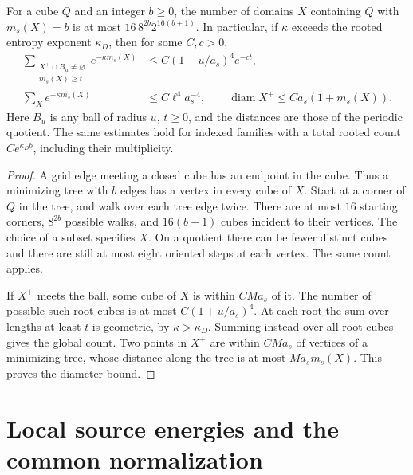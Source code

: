 \documentclass[11pt,letterpaper,reqno]{amsart}
\makeatletter
\numberwithin{equation}{section}
\theoremstyle{definition}
\newcommand{\ms@minorstart}{%
  \pushQED{\qed}\renewcommand{\qedsymbol}{$\blacksquare$}}
\newenvironment{lemma}[1][]{\ms@minorstart\ms@lemma[#1]}
  {\popQED\endms@lemma}
\theoremstyle{remark}
\makeatother
\begin{document}
\begin{samepage}
\begin{lemma}[Rooted domain counts]\label{si:lem-source-count}
For a cube $Q$ and an integer $b\ge0$, the number of domains
$X$ containing $Q$ with $m_s(X)=b$ is at most
$16\,8^{2b}2^{16(b+1)}$. In particular, if $\kappa$ exceeds the
rooted entropy exponent $\kappa_D$, then for some $C,c>0$,
\begin{equation}\label{si:eq-source-count}
 \begin{aligned}
 \sum_{\substack{X^+\cap B_u\ne\varnothing\\m_s(X)\ge t}}
     e^{-\kappa m_s(X)}
   &\le C(1+u/a_s)^4 e^{-ct},\\
 \sum_X e^{-\kappa m_s(X)}
   &\le C\ell^4 a_s^{-4},
 \qquad
 \operatorname{diam}X^+\le C a_s(1+m_s(X)).
 \end{aligned}
\end{equation}
Here $B_u$ is any ball of radius $u$, $t\ge0$, and the distances
are those of the periodic quotient. The same estimates hold for
indexed families with a total rooted count
$C e^{\kappa_D b}$, including their multiplicity.
\end{lemma}
\end{samepage}

\begin{proof}
A grid edge meeting a closed cube has an endpoint in the cube.
Thus a minimizing tree with $b$ edges has a vertex in every
cube of $X$. Start at a corner of $Q$ in the tree, and walk over
each tree edge twice. There are at most $16$ starting corners,
$8^{2b}$ possible walks, and $16(b+1)$ cubes incident to their
vertices. The choice of a subset specifies $X$. On a quotient
there can be fewer distinct cubes and there are still at most
eight oriented steps at each vertex. The same count applies.

If $X^+$ meets the ball, some cube of $X$ is within $CMa_s$ of
it. The number of possible such root cubes is at most
$C(1+u/a_s)^4$. At each root the sum over lengths at least $t$
is geometric, by $\kappa>\kappa_D$. Summing instead over all
root cubes gives the global count. Two points in $X^+$ are
within $CMa_s$ of vertices of a minimizing tree, whose distance
along the tree is at most $Ma_s m_s(X)$. This proves the
diameter bound.
\end{proof}


\section{Local source energies and the common normalization}
\label{si:sec-local-energies}
\end{document}
